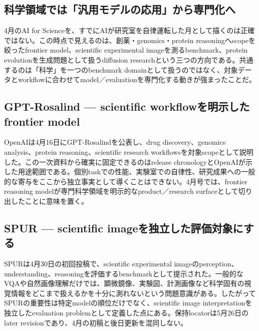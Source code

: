 \begingroup\raggedright
\subsection{科学領域では「汎用モデルの応用」から専門化へ}
\par\endgroup

4月のAI for Scienceを、すでにAIが研究室を自律運転した月として描くのは正確ではない。この時点で見えるのは、創薬・genomics・protein reasoningへscopeを絞ったfrontier model、scientific experimental imageを測るbenchmark、protein evolutionを生成問題として扱うdiffusion researchという三つの方向である。共通するのは「科学」を一つのbenchmark domainとして扱うのではなく、対象データとworkflowに合わせてmodel／evaluationを専門化する動きが強まったことだ。\autocite{src-078f0d540d88,src-7ae707d75c4b,src-f0bb84fcd319}


\begingroup\raggedright
\subsection{GPT-Rosalind — scientific workflowを明示したfrontier model}
\par\endgroup

OpenAIは4月16日にGPT-Rosalindを公表し、drug discovery、genomics analysis、protein reasoning、scientific research workflowsを対象scopeとして説明した。この一次資料から確実に固定できるのはrelease chronologyとOpenAIが示した用途範囲である。個別taskでの性能、実験室での自律性、研究成果への一般的な寄与をここから独立事実として導くことはできない。4月号では、frontier reasoning modelが専門科学領域を明示的なproduct／research surfaceとして切り出したことに意味を置く。\autocite{src-078f0d540d88}


\begingroup\raggedright
\subsection{SPUR — scientific imageを独立した評価対象にする}
\par\endgroup

SPURは4月30日の初回投稿で、scientific experimental imageのperception、understanding、reasoningを評価するbenchmarkとして提示された。一般的なVQAや自然画像理解だけでは、顕微鏡像、実験図、計測画像など科学固有の視覚情報をどこまで扱えるかを十分に測れないという問題意識がある。したがってSPURの重要性は特定modelの順位だけでなく、scientific image interpretationを独立したevaluation problemとして定義した点にある。保持locatorは5月26日のlater revisionであり、4月の初稿と後日更新を混同しない。\autocite{src-7ae707d75c4b}


